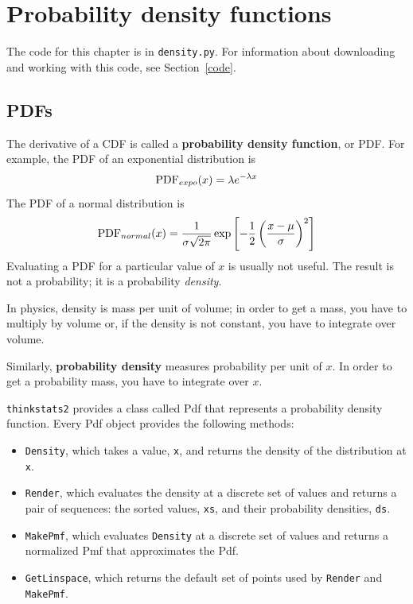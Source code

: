 \documentclass[12pt]{book}
\begin{document}
\chapter{Probability density functions}
\label{density}

The code for this chapter is in {\tt density.py}.  For information
about downloading and working with this code, see Section~\ref{code}.


\section{PDFs}

The derivative of a CDF is called a {\bf probability density function},
or PDF.  For example, the PDF of an exponential distribution is
%
\[ \mathrm{PDF}_{expo}(x) = \lambda e^{-\lambda x}   \]
%
The PDF of a normal distribution is
%
\[ \mathrm{PDF}_{normal}(x) = \frac{1}{\sigma \sqrt{2 \pi}} 
                 \exp \left[ -\frac{1}{2} 
                 \left( \frac{x - \mu}{\sigma} \right)^2 \right]  \]
%
Evaluating a PDF for a particular value of $x$ is usually not useful.
The result is not a probability; it is a probability {\em density}.

In physics, density is mass per unit of
volume; in order to get a mass, you have to multiply by volume or,
if the density is not constant, you have to integrate over volume.

Similarly, {\bf probability density} measures probability per unit of $x$.
In order to get a probability mass, you have to integrate over $x$.

{\tt thinkstats2} provides a class called Pdf that represents
a probability density function.  Every Pdf object provides the
following methods:

\begin{itemize}

\item {\tt Density}, which takes a value, {\tt x}, and returns the
  density of the distribution at {\tt x}.

\item {\tt Render}, which evaluates the density at a discrete set of
  values and returns a pair of sequences: the sorted values, {\tt xs},
  and their probability densities, {\tt ds}.

\item {\tt MakePmf}, which evaluates {\tt Density}
  at a discrete set of values and returns a normalized Pmf that
  approximates the Pdf.

\item {\tt GetLinspace}, which returns the default set of points used 
  by {\tt Render} and {\tt MakePmf}.

\end{itemize}  
\end{document}
